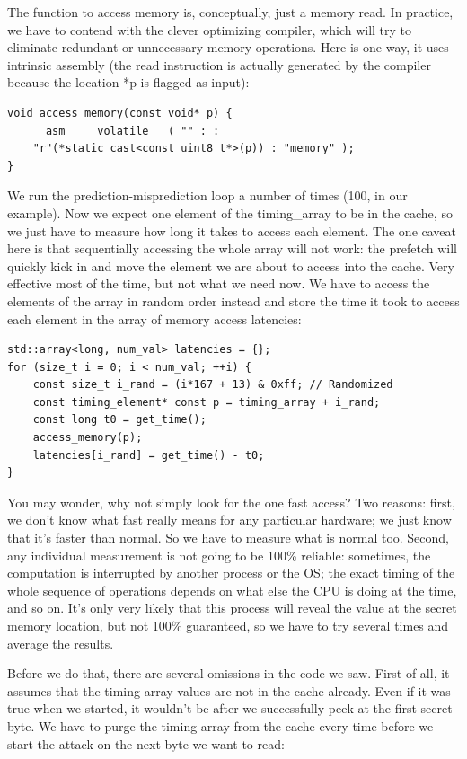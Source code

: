 The function to access memory is, conceptually, just a memory read. In practice, we have to contend with the clever optimizing compiler, which will try to eliminate redundant or unnecessary memory operations. Here is one way, it uses intrinsic assembly (the read instruction is actually generated by the compiler because the location *p is flagged as input):

\begin{lstlisting}[style=styleCXX]
void access_memory(const void* p) {
	__asm__ __volatile__ ( "" : :
	"r"(*static_cast<const uint8_t*>(p)) : "memory" );
}
\end{lstlisting}

We run the prediction-misprediction loop a number of times (100, in our example). Now we expect one element of the timing\_array to be in the cache, so we just have to measure how long it takes to access each element. The one caveat here is that sequentially accessing the whole array will not work: the prefetch will quickly kick in and move the element we are about to access into the cache. Very effective most of the time, but not what we need now. We have to access the elements of the array in random order instead and store the time it took to access each element in the array of memory access latencies:

\begin{lstlisting}[style=styleCXX]
std::array<long, num_val> latencies = {};
for (size_t i = 0; i < num_val; ++i) {
	const size_t i_rand = (i*167 + 13) & 0xff; // Randomized
	const timing_element* const p = timing_array + i_rand;
	const long t0 = get_time();
	access_memory(p);
	latencies[i_rand] = get_time() - t0;
}
\end{lstlisting}

You may wonder, why not simply look for the one fast access? Two reasons: first, we don't know what fast really means for any particular hardware; we just know that it's faster than normal. So we have to measure what is normal too. Second, any individual measurement is not going to be 100\% reliable: sometimes, the computation is interrupted by another process or the OS; the exact timing of the whole sequence of operations depends on what else the CPU is doing at the time, and so on. It's only very likely that this process will reveal the value at the secret memory location, but not 100\% guaranteed, so we have to try several times and average the results.

Before we do that, there are several omissions in the code we saw. First of all, it assumes that the timing array values are not in the cache already. Even if it was true when we started, it wouldn't be after we successfully peek at the first secret byte. We have to purge the timing array from the cache every time before we start the attack on the next byte we want to read:

